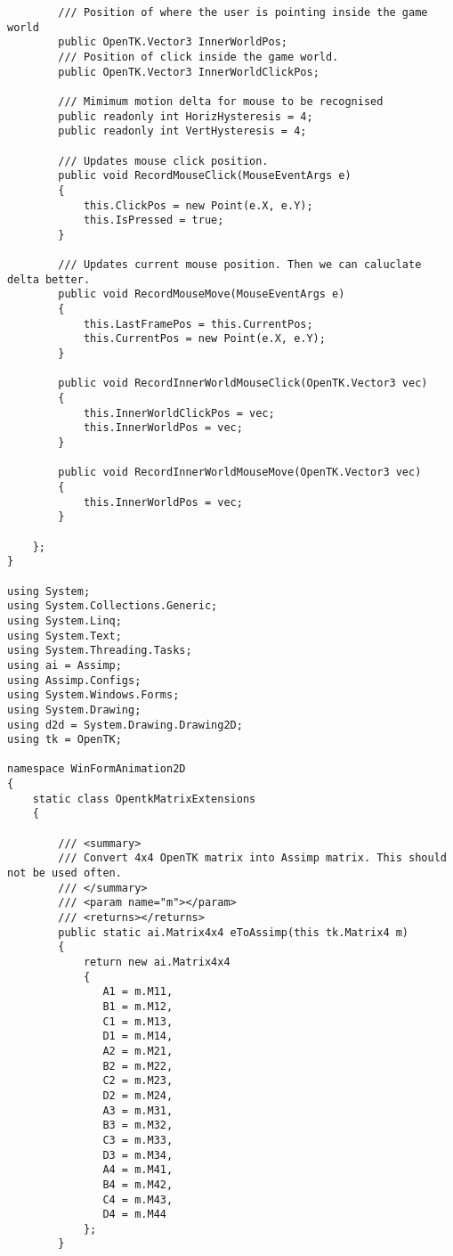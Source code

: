 \begin{scriptsize}
\begin{verbatim}
        /// Position of where the user is pointing inside the game world
        public OpenTK.Vector3 InnerWorldPos;
        /// Position of click inside the game world.
        public OpenTK.Vector3 InnerWorldClickPos;

        /// Mimimum motion delta for mouse to be recognised
        public readonly int HorizHysteresis = 4;
        public readonly int VertHysteresis = 4;

        /// Updates mouse click position.
        public void RecordMouseClick(MouseEventArgs e)
        {
            this.ClickPos = new Point(e.X, e.Y);
            this.IsPressed = true;
        }

        /// Updates current mouse position. Then we can caluclate delta better.
        public void RecordMouseMove(MouseEventArgs e)
        {
            this.LastFramePos = this.CurrentPos;
            this.CurrentPos = new Point(e.X, e.Y);
        }

        public void RecordInnerWorldMouseClick(OpenTK.Vector3 vec)
        {
            this.InnerWorldClickPos = vec;
            this.InnerWorldPos = vec;
        }

        public void RecordInnerWorldMouseMove(OpenTK.Vector3 vec)
        {
            this.InnerWorldPos = vec;
        }

    };
}

using System;
using System.Collections.Generic;
using System.Linq;
using System.Text;
using System.Threading.Tasks;
using ai = Assimp;
using Assimp.Configs;
using System.Windows.Forms;
using System.Drawing;
using d2d = System.Drawing.Drawing2D;
using tk = OpenTK;

namespace WinFormAnimation2D
{
    static class OpentkMatrixExtensions
    {

        /// <summary>
        /// Convert 4x4 OpenTK matrix into Assimp matrix. This should not be used often.
        /// </summary>
        /// <param name="m"></param>
        /// <returns></returns>
        public static ai.Matrix4x4 eToAssimp(this tk.Matrix4 m)
        {
            return new ai.Matrix4x4
            {
               A1 = m.M11,
               B1 = m.M12,
               C1 = m.M13,
               D1 = m.M14,
               A2 = m.M21,
               B2 = m.M22,
               C2 = m.M23,
               D2 = m.M24,
               A3 = m.M31,
               B3 = m.M32,
               C3 = m.M33,
               D3 = m.M34,
               A4 = m.M41,
               B4 = m.M42,
               C4 = m.M43,
               D4 = m.M44
            };
        }
        

\end{verbatim}
\end{scriptsize}
